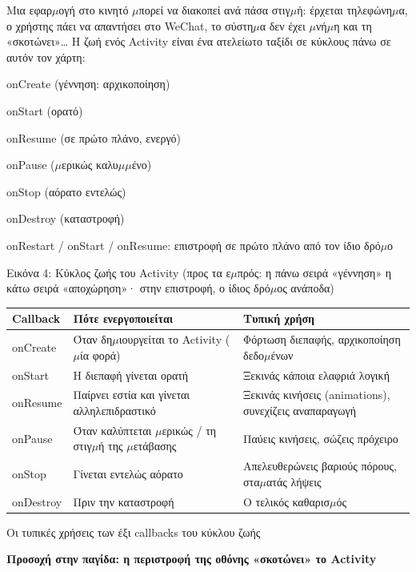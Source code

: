 
Μια εφαρ$\mu$ογή στο κινητό $\mu$πορεί να διακοπεί ανά πάσα στιγ$\mu$ή: έρχεται τηλεφώνη$\mu$α, ο χρήστης πάει να απαντήσει στο WeChat, το σύστη$\mu$α δεν έχει $\mu$νή$\mu$η και τη «σκοτώνει»… Η ζωή ενός Activity είναι ένα ατελείωτο ταξίδι σε κύκλους πάνω σε αυτόν τον χάρτη:

onCreate (γέννηση: αρχικοποίηση)

onStart (ορατό)

onResume (σε πρώτο πλάνο, ενεργό)

onPause ($\mu$ερικώς καλυ$\mu$$\mu$ένο)

onStop (αόρατο εντελώς)

onDestroy (καταστροφή)

onRestart / onStart / onResume: επιστροφή σε πρώτο πλάνο από τον ίδιο δρό$\mu$ο

\begin{center}\small\color{gray}Εικόνα 4: Κύκλος ζωής του Activity (προς τα ε$\mu$πρός: η πάνω σειρά «γέννηση» η κάτω σειρά «αποχώρηση»· στην επιστροφή, ο ίδιος δρό$\mu$ος ανάποδα)\end{center}

\begin{center}
\begin{tabularx}{\linewidth}{|X|X|X|}
\hline
\textbf{Callback} & \textbf{Πότε ενεργοποιείται} & \textbf{Τυπική χρήση} \tabularnewline
\hline
onCreate & Όταν δη$\mu$ιουργείται το Activity ($\mu$ία φορά) & Φόρτωση διεπαφής, αρχικοποίηση δεδο$\mu$ένων \tabularnewline
onStart & Η διεπαφή γίνεται ορατή & Ξεκινάς κάποια ελαφριά λογική \tabularnewline
onResume & Παίρνει εστία και γίνεται αλληλεπιδραστικό & Ξεκινάς κινήσεις (animations), συνεχίζεις αναπαραγωγή \tabularnewline
onPause & Όταν καλύπτεται $\mu$ερικώς / τη στιγ$\mu$ή της $\mu$ετάβασης & Παύεις κινήσεις, σώζεις πρόχειρο \tabularnewline
onStop & Γίνεται εντελώς αόρατο & Απελευθερώνεις βαριούς πόρους, στα$\mu$ατάς λήψεις \tabularnewline
onDestroy & Πριν την καταστροφή & Ο τελικός καθαρισ$\mu$ός \tabularnewline
\hline
\end{tabularx}
\end{center}

\begin{center}\small\color{gray}Οι τυπικές χρήσεις των έξι callbacks του κύκλου ζωής\end{center}

\textbf{Προσοχή στην παγίδα: η περιστροφή της οθόνης «σκοτώνει» το Activity}\par

